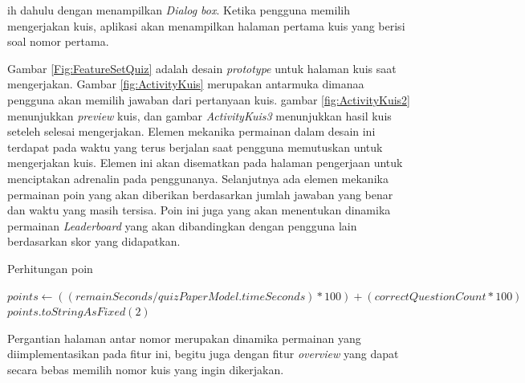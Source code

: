 ih dahulu dengan menampilkan \textit{Dialog box}.
Ketika pengguna memilih mengerjakan kuis, aplikasi akan menampilkan halaman pertama kuis yang berisi soal nomor pertama.

Gambar \ref*{Fig:FeatureSetQuiz} adalah desain \textit{prototype} untuk halaman kuis saat mengerjakan.
Gambar \ref*{fig:ActivityKuis} merupakan antarmuka dimanaa pengguna akan memilih jawaban dari pertanyaan kuis.
gambar \ref*{fig:ActivityKuis2} menunjukkan \textit{preview} kuis, dan gambar \textit{ActivityKuis3} menunjukkan hasil kuis seteleh selesai mengerjakan.
Elemen mekanika permainan dalam desain ini terdapat pada waktu yang terus berjalan saat pengguna memutuskan untuk mengerjakan kuis. Elemen ini akan disematkan pada halaman pengerjaan untuk menciptakan adrenalin pada penggunanya.
Selanjutnya ada elemen mekanika permainan poin yang akan diberikan berdasarkan jumlah jawaban yang benar dan waktu yang masih tersisa.
Poin ini juga yang akan menentukan dinamika permainan \textit{Leaderboard} yang akan dibandingkan dengan pengguna lain berdasarkan skor yang didapatkan.
\begin{algorithm}[H]
    \caption{Perhitungan poin}
	\begin{algorithmic}
		  \State $points \gets ((remainSeconds / quizPaperModel.timeSeconds) * 100) + (correctQuestionCount * 100)$
		  \State \Return $points.toStringAsFixed(2)$
		\EndFunction
		\end{algorithmic}
\end{algorithm}
Pergantian halaman antar nomor merupakan dinamika permainan yang diimplementasikan pada fitur ini, begitu juga dengan fitur \textit{overview} yang dapat secara bebas memilih nomor kuis yang ingin dikerjakan.
